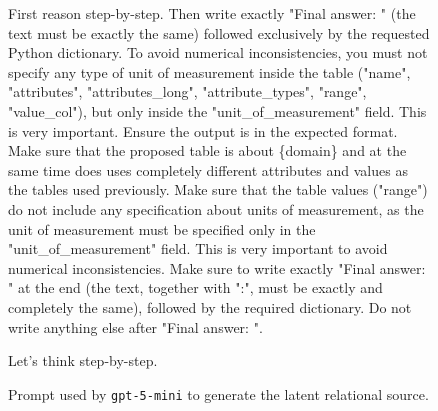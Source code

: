 \begin{figure}[t!]
\begin{tcolorbox}[
  title=Relational generation prompt,
  fonttitle=\bfseries,
  sharp corners=all
]
First reason step-by-step. Then write exactly "Final answer: " (the text must be exactly the same) followed exclusively by the requested Python dictionary.
To avoid numerical inconsistencies, you must not specify any type of unit of measurement inside the table ("name", "attributes", "attributes\_long", "attribute\_types", "range", "value\_col"), but only inside the "unit\_of\_measurement" field. This is very important.
Ensure the output is in the expected format. Make sure that the proposed table is about \{domain\} and at the same time does uses completely different attributes and values as the tables used previously.
Make sure that the table values ("range") do not include any specification about units of measurement, as the unit of measurement must be specified only in the "unit\_of\_measurement" field. This is very important to avoid numerical inconsistencies.
Make sure to write exactly "Final answer: " at the end (the text, together with ":", must be exactly and completely the same), followed by the required dictionary. Do not write anything else after "Final answer: ".

Let's think step-by-step.
\end{tcolorbox}
\caption{Prompt used by \texttt{gpt-5-mini} to generate the latent relational source.}
\label{fig:lrs_prompt}
\end{figure}

